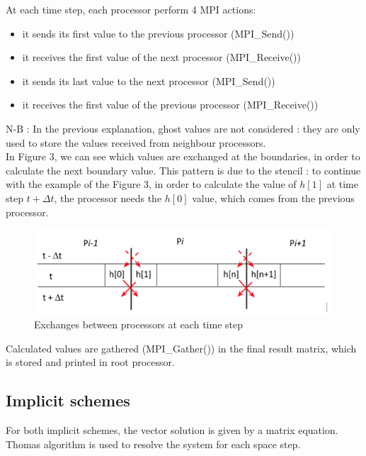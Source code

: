\documentclass{article}
\begin{document}
            At each time step, each processor perform 4 MPI actions:
            \begin{itemize}
                \item{it sends its first value to the previous processor (MPI\_Send()) }
                \item{it receives the first value of the next processor (MPI\_Receive())}
                \item{it sends its last value to the next processor (MPI\_Send())}
                \item{it receives the first value of the previous processor (MPI\_Receive())}
            \end{itemize}
            N-B : In the previous explanation, ghost values are not considered : they are only used
            to store the values received from neighbour processors.\\
            In Figure 3, we can see which values are exchanged at the boundaries, in order to
            calculate the next boundary value. This pattern is due to the stencil : to continue
            with the example of the Figure 3, in order to calculate the value of $h[1]$ at time step
            $t+\Delta{t}$, the processor needs the $h[0]$ value, which comes from the previous processor.
            \begin{figure}[H]
                \includegraphics[width=\textwidth]{parallel_explicit.png}
                \caption{Exchanges between processors at each time step}
            \end{figure}

            Calculated values are gathered (MPI\_Gather()) in the final result matrix, which is stored 
            and printed in root processor.

    
            \subsection{Implicit schemes}
    
                    For both implicit schemes, the vector solution is given by a matrix equation. 
                    Thomas algorithm is used to resolve the system for each space step.
    
\end{document}
